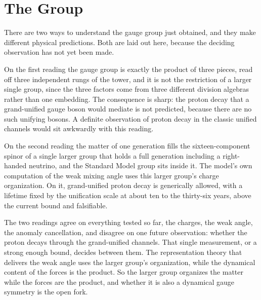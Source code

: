 \section{The Group}

There are two ways to understand the gauge group just obtained, and they make different physical predictions. Both are
laid out here, because the deciding observation has not yet been made.

On the first reading the gauge group is exactly the product of three pieces, read off three independent rungs of the
tower, and it is not the restriction of a larger single group, since the three factors come from three different division
algebras rather than one embedding. The consequence is sharp: the proton decay that a grand-unified gauge boson would
mediate is not predicted, because there are no such unifying bosons. A definite observation of proton decay in the classic
unified channels would sit awkwardly with this reading.

On the second reading the matter of one generation fills the sixteen-component spinor of a single larger group that holds
a full generation including a right-handed neutrino, and the Standard Model group sits inside it. The model's own
computation of the weak mixing angle uses this larger group's charge organization. On it,
grand-unified proton decay is generically allowed, with a lifetime fixed by the unification scale at about ten to the
thirty-six years, above the current bound and falsifiable.

The two readings agree on everything tested so far, the charges, the weak angle, the anomaly cancellation, and disagree
on one future observation: whether the proton decays through the grand-unified channels. That single measurement, or a
strong enough bound, decides between them. The representation theory that delivers the weak angle uses the larger
group's organization, while the dynamical content of the forces is the product. So the larger group organizes the
matter while the forces are the product, and whether it is also a dynamical gauge symmetry is the open fork.
